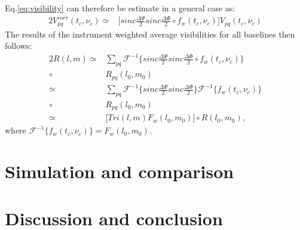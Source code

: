 Eq.\ref{eq:visibility} can therefore be estimate in a general case as:
\begin{alignat}{2}
 V_{pq}^{corr}(t_c, \nu_c)\simeq& \bigg[sinc\frac{\Delta \Psi}{2}sinc\frac{\Delta \Phi}{2}\circ f_{w}(t_c,\nu_c)\bigg]
			   V_{pq}(t_{c},\nu_{c})
\end{alignat}
The  results of the instrument weighted average visibilities for all baselines then follows:
\begin{alignat}{2}
R(l,m)\simeq& \sum_{pq}\mathcal{F}^{-1}\bigg\{sinc\frac{\Delta \Psi}{2}sinc\frac{\Delta \Phi}{2}\circ f_{w}(t_c,\nu_c)\bigg\}\\
	\circ& R_{pq}(l_0,m_0)\\
	\simeq& \sum_{pq}\mathcal{F}^{-1}\bigg\{sinc\frac{\Delta \Psi}{2}sinc\frac{\Delta 
\Phi}{2}\bigg\}\mathcal{F}^{-1}\bigg\{f_{w}(t_c,\nu_c)\bigg\}\\
	\circ& R_{pq}(l_0,m_0)\\
	\simeq& \bigg[Tri(l,m)F_{w}(l_0,m_0)\bigg]\circ R(l_0,m_0),
\end{alignat}
where $\mathcal{F}^{-1}\bigg\{f_{w}(t_c,\nu_c)\bigg\}=F_{w}(l_0,m_0)$.
\section{Simulation and comparison}
\section{Discussion and conclusion}